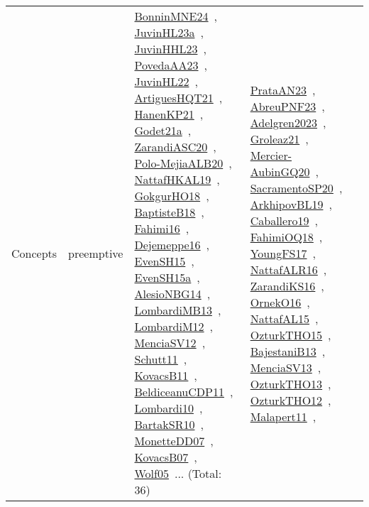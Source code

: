 {\begin{longtable}{lp{3cm}>{\raggedright\arraybackslash}p{6cm}>{\raggedright\arraybackslash}p{6cm}>{\raggedright\arraybackslash}p{8cm}}
Concepts & preemptive & \href{../works/BonninMNE24.pdf}{BonninMNE24}~\cite{BonninMNE24}, \href{../works/JuvinHL23a.pdf}{JuvinHL23a}~\cite{JuvinHL23a}, \href{../works/JuvinHHL23.pdf}{JuvinHHL23}~\cite{JuvinHHL23}, \href{../works/PovedaAA23.pdf}{PovedaAA23}~\cite{PovedaAA23}, \href{../works/JuvinHL22.pdf}{JuvinHL22}~\cite{JuvinHL22}, \href{../works/ArtiguesHQT21.pdf}{ArtiguesHQT21}~\cite{ArtiguesHQT21}, \href{../works/HanenKP21.pdf}{HanenKP21}~\cite{HanenKP21}, \href{../works/Godet21a.pdf}{Godet21a}~\cite{Godet21a}, \href{../works/ZarandiASC20.pdf}{ZarandiASC20}~\cite{ZarandiASC20}, \href{../works/Polo-MejiaALB20.pdf}{Polo-MejiaALB20}~\cite{Polo-MejiaALB20}, \href{../works/NattafHKAL19.pdf}{NattafHKAL19}~\cite{NattafHKAL19}, \href{../works/GokgurHO18.pdf}{GokgurHO18}~\cite{GokgurHO18}, \href{../works/BaptisteB18.pdf}{BaptisteB18}~\cite{BaptisteB18}, \href{../works/Fahimi16.pdf}{Fahimi16}~\cite{Fahimi16}, \href{../works/Dejemeppe16.pdf}{Dejemeppe16}~\cite{Dejemeppe16}, \href{../works/EvenSH15.pdf}{EvenSH15}~\cite{EvenSH15}, \href{../works/EvenSH15a.pdf}{EvenSH15a}~\cite{EvenSH15a}, \href{../works/AlesioNBG14.pdf}{AlesioNBG14}~\cite{AlesioNBG14}, \href{../works/LombardiMB13.pdf}{LombardiMB13}~\cite{LombardiMB13}, \href{../works/LombardiM12.pdf}{LombardiM12}~\cite{LombardiM12}, \href{../works/MenciaSV12.pdf}{MenciaSV12}~\cite{MenciaSV12}, \href{../works/Schutt11.pdf}{Schutt11}~\cite{Schutt11}, \href{../works/KovacsB11.pdf}{KovacsB11}~\cite{KovacsB11}, \href{../works/BeldiceanuCDP11.pdf}{BeldiceanuCDP11}~\cite{BeldiceanuCDP11}, \href{../works/Lombardi10.pdf}{Lombardi10}~\cite{Lombardi10}, \href{../works/BartakSR10.pdf}{BartakSR10}~\cite{BartakSR10}, \href{../works/MonetteDD07.pdf}{MonetteDD07}~\cite{MonetteDD07}, \href{../works/KovacsB07.pdf}{KovacsB07}~\cite{KovacsB07}, \href{../works/Wolf05.pdf}{Wolf05}~\cite{Wolf05}... (Total: 36) & \href{../works/PrataAN23.pdf}{PrataAN23}~\cite{PrataAN23}, \href{../works/AbreuPNF23.pdf}{AbreuPNF23}~\cite{AbreuPNF23}, \href{../works/Adelgren2023.pdf}{Adelgren2023}~\cite{Adelgren2023}, \href{../works/Groleaz21.pdf}{Groleaz21}~\cite{Groleaz21}, \href{../works/Mercier-AubinGQ20.pdf}{Mercier-AubinGQ20}~\cite{Mercier-AubinGQ20}, \href{../works/SacramentoSP20.pdf}{SacramentoSP20}~\cite{SacramentoSP20}, \href{../works/ArkhipovBL19.pdf}{ArkhipovBL19}~\cite{ArkhipovBL19}, \href{../works/Caballero19.pdf}{Caballero19}~\cite{Caballero19}, \href{../works/FahimiOQ18.pdf}{FahimiOQ18}~\cite{FahimiOQ18}, \href{../works/YoungFS17.pdf}{YoungFS17}~\cite{YoungFS17}, \href{../works/NattafALR16.pdf}{NattafALR16}~\cite{NattafALR16}, \href{../works/ZarandiKS16.pdf}{ZarandiKS16}~\cite{ZarandiKS16}, \href{../works/OrnekO16.pdf}{OrnekO16}~\cite{OrnekO16}, \href{../works/NattafAL15.pdf}{NattafAL15}~\cite{NattafAL15}, \href{../works/OzturkTHO15.pdf}{OzturkTHO15}~\cite{OzturkTHO15}, \href{../works/BajestaniB13.pdf}{BajestaniB13}~\cite{BajestaniB13}, \href{../works/MenciaSV13.pdf}{MenciaSV13}~\cite{MenciaSV13}, \href{../works/OzturkTHO13.pdf}{OzturkTHO13}~\cite{OzturkTHO13}, \href{../works/OzturkTHO12.pdf}{OzturkTHO12}~\cite{OzturkTHO12}, \href{../works/Malapert11.pdf}{Malapert11}~\cite{Malapert11}, 
\end{longtable}}
